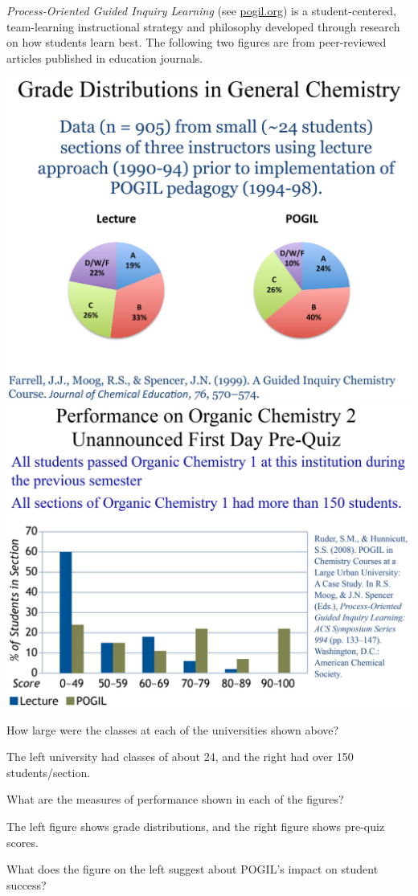 
\textit{Process-Oriented Guided Inquiry Learning} (see \href{https://pogil.org/}{pogil.org}) is a student-centered, team-learning instructional strategy and philosophy developed through research on how students learn best.
The following two figures are from peer-reviewed articles published in education journals.


\vspace{1em}
\includegraphics[width=0.47\linewidth]{pogil-grades.png}
\hfill
\includegraphics[width=0.50\linewidth]{pogil-prequiz.png}




\Q How large were the classes at each of the universities shown above?

\begin{answer}[2em]
The left university had classes of about 24, and the right had over 150 students/section.
\end{answer}


\Q What are the measures of performance shown in each of the figures?

\begin{answer}[2em]
The left figure shows grade distributions, and the right figure shows pre-quiz scores.
\end{answer}


\Q What does the figure on the left suggest about POGIL's impact on student success?

